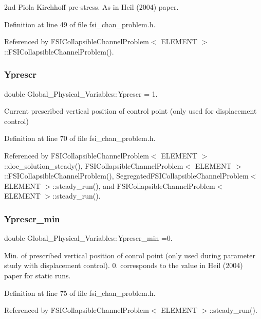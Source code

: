 2nd Piola Kirchhoff pre-\/stress. As in Heil (2004) paper. 



Definition at line 49 of file fsi\+\_\+chan\+\_\+problem.\+h.



Referenced by F\+S\+I\+Collapsible\+Channel\+Problem$<$ E\+L\+E\+M\+E\+N\+T $>$\+::\+F\+S\+I\+Collapsible\+Channel\+Problem().

\mbox{\label{namespaceGlobal__Physical__Variables_afd29cc714595594020831c7c54387883}} 
\subsubsection{\texorpdfstring{Yprescr}{Yprescr}}
{\footnotesize\ttfamily double Global\+\_\+\+Physical\+\_\+\+Variables\+::\+Yprescr = 1.}



Current prescribed vertical position of control point (only used for displacement control) 



Definition at line 70 of file fsi\+\_\+chan\+\_\+problem.\+h.



Referenced by F\+S\+I\+Collapsible\+Channel\+Problem$<$ E\+L\+E\+M\+E\+N\+T $>$\+::doc\+\_\+solution\+\_\+steady(), F\+S\+I\+Collapsible\+Channel\+Problem$<$ E\+L\+E\+M\+E\+N\+T $>$\+::\+F\+S\+I\+Collapsible\+Channel\+Problem(), Segregated\+F\+S\+I\+Collapsible\+Channel\+Problem$<$ E\+L\+E\+M\+E\+N\+T $>$\+::steady\+\_\+run(), and F\+S\+I\+Collapsible\+Channel\+Problem$<$ E\+L\+E\+M\+E\+N\+T $>$\+::steady\+\_\+run().

\mbox{\label{namespaceGlobal__Physical__Variables_ad6b457166fefe63a8341e9d0faefe892}} 
\subsubsection{\texorpdfstring{Yprescr\+\_\+min}{Yprescr\_min}}
{\footnotesize\ttfamily double Global\+\_\+\+Physical\+\_\+\+Variables\+::\+Yprescr\+\_\+min =0.}

Min. of prescribed vertical position of conrol point (only used during parameter study with displacement control). 0. corresponds to the value in Heil (2004) paper for static runs. 

Definition at line 75 of file fsi\+\_\+chan\+\_\+problem.\+h.



Referenced by F\+S\+I\+Collapsible\+Channel\+Problem$<$ E\+L\+E\+M\+E\+N\+T $>$\+::steady\+\_\+run().

